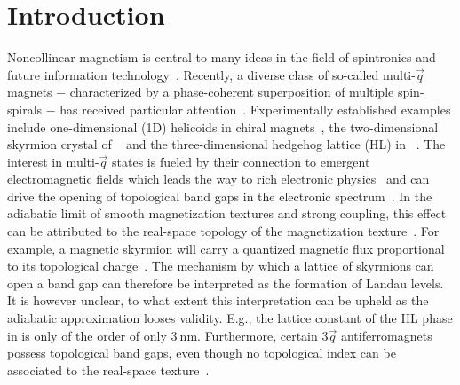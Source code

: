\documentclass[
    10pt,
    aps,
    prb,
    twocolumn,
    floatfix,
    superscriptaddress,
]{revtex4-2}
\begin{document}
\section{Introduction}
Noncollinear magnetism is central to many ideas in the field of spintronics and future information technology~\cite{Vedmedenko2020, Back2020}.
Recently, a diverse class of so-called multi-$\vec{q}$ magnets $-$ characterized by a phase-coherent superposition of multiple spin-spirals $-$ has received particular attention~\cite{Okubo2012, Takagi2018, Hirschberger2019, Fujishiro2019, Okumura2020}.
Experimentally established examples include one-dimensional (1D) helicoids in chiral magnets~\cite{Adams2012,Janoschek2013}, the two-dimensional skyrmion crystal of ~\cite{Neubauer2009} and the three-dimensional hedgehog lattice (HL) in ~\cite{Tanigaki2015}.
The interest in multi-$\vec{q}$ states is fueled by their connection to emergent electromagnetic fields which leads the way to rich electronic physics~\cite{ Bliokh2005, Fujita2011}
and can drive the opening of topological band gaps in the electronic spectrum~\cite{Hamamoto2015, Goebel2017, Goebel2018}.
In the adiabatic limit of smooth magnetization textures and strong coupling, this effect can be attributed to the real-space topology of the magnetization texture~\cite{Bruno2004, EverschorSitte2014}.
For example, a magnetic skyrmion will carry a quantized magnetic flux proportional to its topological charge~\cite{Nagaosa2013}. 
The mechanism by which a lattice of skyrmions can open a band gap can therefore be interpreted as the formation of Landau levels.
It is however unclear, to what extent this interpretation can be upheld as the adiabatic approximation looses validity.
E.g., the lattice constant of the HL phase in  is only of the order of only $\SI{3}{\nano\meter}$.
Furthermore, certain $3\vec{q}$ antiferromagnets possess topological band gaps, even though no topological index can be associated to the real-space texture~\cite{Ndiaye2019, Feng2020}.
\end{document}
